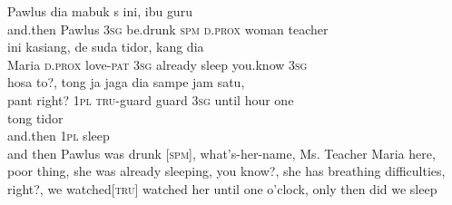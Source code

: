 \ea
{}    {Pawlus}    {dia}    {mabuk}    {s}    {ini,}    {ibu}    {guru}\\
   {and.then}    {Pawlus}    {\textsc{3sg}}    {be.drunk}    {\textsc{spm}}    {\textsc{d.prox}}    {woman}    {teacher}\\
    {ini}    {kasiang,}   de    {suda}    {tidor,}    {kang}   dia\\
   {Maria}    {\textsc{d.prox}}    {love-\textsc{pat}}   \textsc{3sg}    {already}    {sleep}    {you.know}   \textsc{3sg}\\
\gll hosa    {to?,}    {tong}    {ja}    {jaga}    {dia}    {sampe}    {jam}   satu,\\
  pant    {right?}    {\textsc{1pl}}    {\textsc{tru}{}-guard}    {guard}    {\textsc{3sg}}    {until}    {hour}   one\\
    {tong}    {tidor}\\
   {and.then}    {\textsc{1pl}}    {sleep}\\
\glt
and then Pawlus was drunk [\textsc{spm}], what’s-her-name, Ms. Teacher Maria here, poor thing, she was already sleeping, you know?, she has breathing difficulties, right?, we watched[\textsc{tru}] watched her until one o’clock, only then did we sleep
\z

